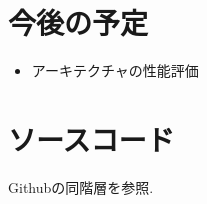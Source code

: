 \documentclass[twocolumn]{jarticle}     %
\begin{document}
\section{今後の予定}
\begin{itemize}
  \item アーキテクチャの性能評価
\end{itemize}

\section{ソースコード}
Githubの同階層を参照.



\end{document}
